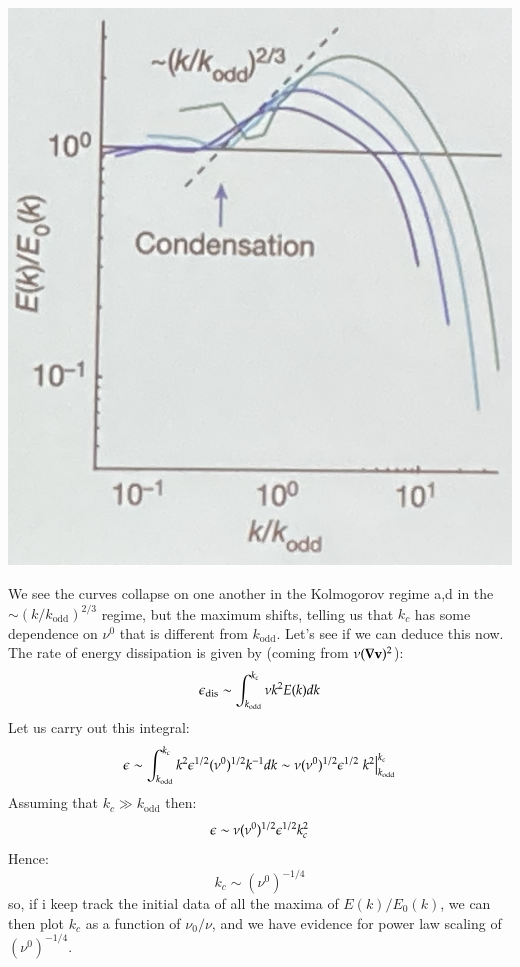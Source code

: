 \begin{center}
    \includegraphics[scale=0.3]{Lectures/Images/lec16-Escaling.png}
\end{center}

We see the curves collapse on one another in the Kolmogorov regime a,d in the $\sim(k/k_{\text{odd}})^{2/3}$ regime, but the maximum shifts, telling us that $k_c$ has some dependence on $\nu^0$ that is different from $k_{\text{odd}}$. Let's see if we can deduce this now. The rate of energy dissipation is given by (coming from $\nu(\nabla \v{v})^2$):
\begin{equation}
    \epsilon_{\text{dis}} \sim \int_{k_{\text{odd}}}^{k_c} \nu k^2 E(k)dk
\end{equation}
Let us carry out this integral:
\begin{equation}
    \epsilon \sim \int_{k_{\text{odd}}}^{k_c}k^2 \epsilon^{1/2}(\nu^0)^{1/2}k^{-1}dk \sim \nu (\nu^0)^{1/2}\epsilon^{1/2}\left.k^2\right|^{k_c}_{k_{\text{odd}}}
\end{equation}
Assuming that $k_c \gg k_{\text{odd}}$ then:
\begin{equation}
    \epsilon \sim \nu (\nu^0)^{1/2}\epsilon^{1/2}k_c^2
\end{equation}
Hence:
\begin{equation}
    \boxed{k_c \sim (\nu^0)^{-1/4}}
\end{equation}
so, if i keep track the initial data of all the maxima of $E(k)/E_0(k)$, we can then plot $k_c$ as a function of $\nu_0/\nu$, and we have evidence for power law scaling of $(\nu^0)^{-1/4}$.

